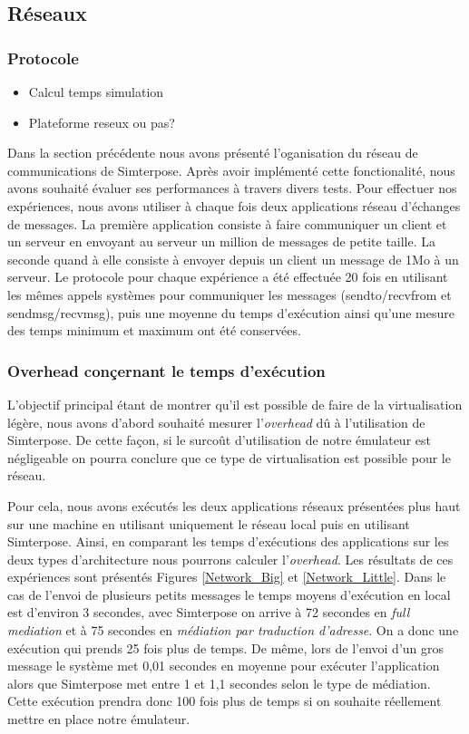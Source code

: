 \subsection{Réseaux}
\label{subsection:res}
\subsubsection{Protocole}
\begin{itemize}
  \item Calcul temps simulation
  \item Plateforme reseux ou pas?
\end{itemize}

Dans la section précédente nous avons présenté l'oganisation du réseau de communications de Simterpose. Après avoir implémenté cette fonctionalité, nous avons souhaité évaluer ses performances à travers divers tests. Pour effectuer nos expériences, nous avons utiliser à chaque fois deux applications réseau d'échanges de messages. La première application consiste à faire communiquer un client et un serveur en envoyant au serveur un million de messages de petite taille. La seconde quand à elle consiste à envoyer depuis un client un message de 1Mo à un serveur. Le protocole pour chaque expérience a été effectuée 20 fois en utilisant les mêmes appels systèmes pour communiquer les messages ({\color{red}sendto/recvfrom et sendmsg/recvmsg}), puis une moyenne du temps d'exécution ainsi qu'une mesure des temps minimum et maximum ont été conservées.

\subsubsection{Overhead conçernant le temps d'exécution}
L'objectif principal étant de montrer qu'il est possible de faire de la virtualisation légère, nous avons d'abord souhaité mesurer l'\textit{overhead} dû à l'utilisation de Simterpose. De cette façon, si le surcoût d'utilisation de notre émulateur est négligeable on pourra conclure que ce type de virtualisation est possible pour le réseau.

Pour cela, nous avons exécutés les deux applications réseaux présentées plus haut sur une machine en utilisant uniquement le réseau local puis en utilisant Simterpose. Ainsi, en comparant les temps d'exécutions des applications sur les deux types d'architecture nous pourrons calculer l'\textit{overhead}. Les résultats de ces expériences sont présentés Figures \ref{Network_Big} et \ref{Network_Little}. Dans le cas de l'envoi de plusieurs petits messages le temps moyens d'exécution en local est d'environ 3 secondes, avec Simterpose on arrive à 72 secondes en \textit{full mediation} et à 75 secondes en \textit{médiation par traduction d'adresse}. On a donc une exécution qui prends 25 fois plus de temps. De même, lors de l'envoi d'un gros message le système met 0,01 secondes en moyenne pour exécuter l'application alors que Simterpose met entre 1 et 1,1 secondes selon le type de médiation. Cette exécution prendra donc 100 fois plus de temps si on souhaite réellement mettre en place notre émulateur.

